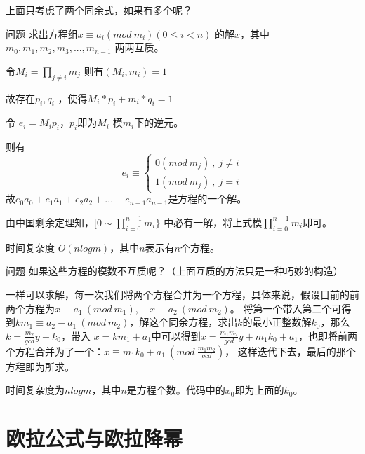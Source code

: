 \vbox{}

上面只考虑了两个同余式，如果有多个呢？

\begin{custom}{问题}
	求出方程组$x\equiv a_i(mod \ m_i) (0 \leqslant i <n) $ 的解$x$，其中$m_0,m_1,m_2,m_3,...,m_{n-1}$ 两两互质。
\end{custom}

\begin{solution}
	令$M_i=\prod_{j\neq i}m_j$     则有$(M_i,m_i)=1$   
	
	故存在$p_i,q_i$ ，使得$M_i*p_i+m_i*q_i=1$ 
	
	令  $e_i=M_ip_i$，\quad    $p_i$即为$M_i$ 模$m_i$下的逆元。   
	
	则有
$$
e_i\equiv\left\{\begin{matrix}
0(mod\ m_j)\ ,\ j\neq i\\ 
1(mod\ m_j)\ ,\ j=i
\end{matrix}\right.	
$$	
	故$e_0a_0+e_1a_1+e_2a_2+...+e_{n-1}a_{n-1}$是方程的一个解。
	
	由中国剩余定理知，$[0\sim\prod_{i=0}^{n-1}m_i\}$ 中必有一解，将上式模$\prod_{i=0}^{n-1}m_i$即可。 
\end{solution}

时间复杂度  $O(nlogm)$，其中$n$表示有$n$个方程。



\begin{custom}{问题}
	如果这些方程的{\heiti 模数不互质}呢？（上面互质的方法只是一种巧妙的构造）
\end{custom}

一样可以求解，每一次我们将两个方程合并为一个方程，具体来说，假设目前的前两个方程为$x\equiv a_1 \ (mod\ m_1),\quad  x\equiv a_2 \ (mod\ m_2)$。
将第一个带入第二个可得到$km_1\equiv a_2-a_1 \ (mod\ m_2)$，解这个同余方程，求出$k$的最小正整数解$k_0$，那么$k = \frac{m_2}{gcd}y+ k_0$，带入
$x=km_1+a_1$中可以得到$x=\frac{m_1m_2}{gcd}y+m_1k_0+a_1$，也即将前两个方程合并为了一个：$x\equiv m_1k_0+a_1\ (mod\ \frac{m_1m_2}{gcd})$，
这样迭代下去，最后的那个方程即为所求。

时间复杂度为$nlogm$，其中$n$是方程个数。{\heiti 代码中的$x_0$即为上面的$k_0$。}



\section{欧拉公式与欧拉降幂}

